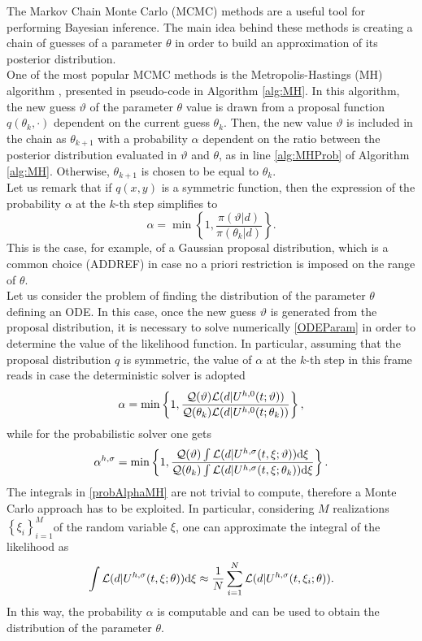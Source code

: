 The Markov Chain Monte Carlo (MCMC) methods are a useful tool for performing Bayesian inference. The main idea behind these methods is creating a chain of guesses of a parameter $\theta$ in order to build an approximation of its posterior distribution. \\
One of the most popular MCMC methods is the Metropolis-Hastings (MH) algorithm \cite{KaS05}, presented in pseudo-code in Algorithm \ref{alg:MH}. In this algorithm, the new guess $\vartheta$ of the parameter $\theta$ value is drawn from a proposal function $q(\theta_k, \cdot)$ dependent on the current guess $\theta_k$. Then, the new value $\vartheta$ is included in the chain as $\theta_{k+1}$ with a probability $\alpha$ dependent on the ratio between the posterior distribution evaluated in $\vartheta$ and $\theta$, as in line \ref{alg:MHProb} of Algorithm \ref{alg:MH}. Otherwise, $\theta_{k+1}$ is chosen to be equal to $\theta_k$. \\
Let us remark that if $q(x, y)$ is a symmetric function, then the expression of the probability $\alpha$ at the $k$-th step simplifies to 
\begin{equation}
	\alpha = \min\left\{1, \frac{\pi(\vartheta|d)}{\pi(\theta_k|d)}\right\}.
\end{equation}
This is the case, for example, of a Gaussian proposal distribution, which is a common choice (ADDREF) in case no a priori restriction is imposed on the range of $\theta$. \\
Let us consider the problem of finding the distribution of the parameter $\theta$ defining an ODE. In this case, once the new guess $\vartheta$ is generated from the proposal distribution, it is necessary to solve numerically \eqref{ODEParam} in order to determine the value of the likelihood function. In particular, assuming that the proposal distribution $q$ is symmetric, the value of $\alpha$ at the $k$-th step in this frame reads in case the deterministic solver is adopted
\begin{equation}\label{detAlphaMH}
	\alpha = \min\left\{1, \frac{\mathcal{Q}(\vartheta)\mathcal{L}(d|U^{h,0}(t; \vartheta))}{\mathcal{Q}(\theta_k)\mathcal{L}(d|U^{h,0}(t; \theta_k))}\right\},
\end{equation} 
while for the probabilistic solver one gets
\begin{equation}\label{probAlphaMH}
	\alpha^{h,\sigma} = \min\left\{1, \frac{\mathcal{Q}(\vartheta)\int{\mathcal{L}(d|U^{h,\sigma}(t,\xi; \vartheta))\dd\xi}}{\mathcal{Q}(\theta_k)\int{\mathcal{L}(d|U^{h,\sigma}(t,\xi; \theta_k))\dd\xi}}\right\}.
\end{equation} 
The integrals in \eqref{probAlphaMH} are not trivial to compute, therefore a Monte Carlo approach has to be exploited. In particular, considering $M$ realizations $\left\{\xi_i\right\}_{i=1}^M$of the random variable $\xi$, one can approximate the integral of the likelihood as
\begin{equation}\label{MCapproxL}
	\int{\mathcal{L}(d|U^{h,\sigma}(t,\xi; \theta))\dd\xi} \approx \frac{1}{N} \sum_{i=1}^{N} \mathcal{L}(d|U^{h,\sigma}(t,\xi_i; \theta)).
\end{equation}
In this way, the probability $\alpha$ is computable and can be used to obtain the distribution of the parameter $\theta$.

